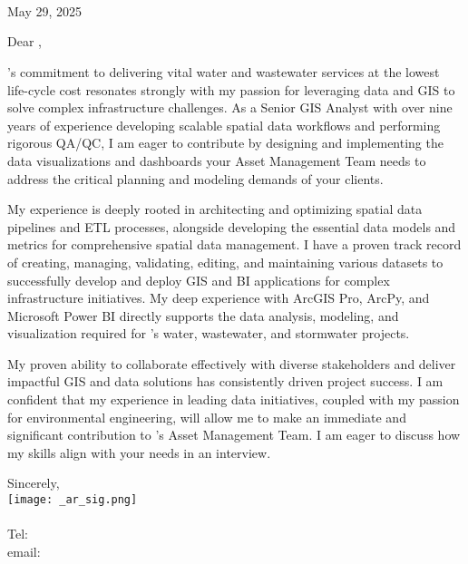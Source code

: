 \documentclass[letterpaper]{article}
\begin{document}
\large
\JobManager \\
\JobManagerTitle \\
\textbf{\JobCompany} \\

\null\hfill May 29, 2025

Dear \JobManagerShort,

\JobCompany 's commitment to delivering vital water and wastewater services at 
the lowest life-cycle cost resonates strongly with my passion for leveraging data and GIS 
to solve complex infrastructure challenges. 
As a Senior GIS Analyst with over nine years of experience developing scalable spatial data workflows 
and performing rigorous QA/QC, I am eager to contribute 
by designing and implementing the data visualizations and dashboards your Asset Management Team needs 
to address the critical planning and modeling demands of your clients.

My experience is deeply rooted in architecting and optimizing spatial data pipelines and ETL processes, 
alongside developing the essential data models and metrics for comprehensive spatial data management. 
I have a proven track record of creating, managing, validating, editing, and maintaining various datasets 
to successfully develop and deploy GIS and BI applications for complex infrastructure initiatives. 
My deep experience with ArcGIS Pro, ArcPy, and Microsoft Power BI 
directly supports the data analysis, modeling, and visualization required for 
\JobCompany 's water, wastewater, and stormwater projects. 

My proven ability to collaborate effectively with diverse stakeholders and deliver impactful 
GIS and data solutions has consistently driven project success. 
I am confident that my experience in leading data initiatives, coupled with 
my passion for environmental engineering, will allow me to make an immediate and significant 
contribution to \JobCompany 's Asset Management Team. 
I am eager to discuss how my skills align with your needs in an interview.

Sincerely,\\
    \hspace{1em}
    \texttt{[image: \_ar\_sig.png]} \\
    \CVsigname \\
    \small
    Tel: \CVphone \\
    email: \CVemail
\end{document}
